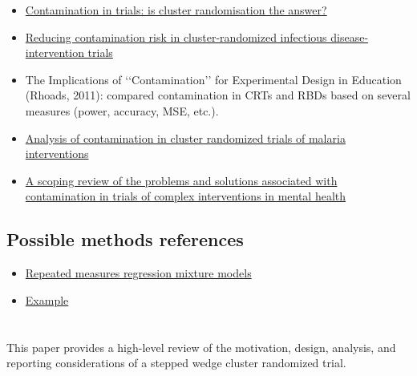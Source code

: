 \documentclass{article}
\begin{document}
\begin{itemize}

\item
\href{https://www.ncbi.nlm.nih.gov/pmc/articles/PMC1119583/}{Contamination in trials: is cluster randomisation the answer?}

\item
\href{https://academic.oup.com/ije/article/47/6/2015/5146518}{Reducing contamination risk in cluster-randomized infectious disease-intervention trials}

\item
The Implications of ‘‘Contamination’’ for Experimental Design in Education (Rhoads, 2011): compared contamination in CRTs and RBDs based on several measures (power, accuracy, MSE, etc.).

\item
\href{https://trialsjournal.biomedcentral.com/articles/10.1186/s13063-021-05543-8}{Analysis of contamination in cluster randomized trials of malaria interventions}

\item
\href{https://bmcmedresmethodol.biomedcentral.com/articles/10.1186/s12874-018-0646-z}{A scoping review of the problems and solutions associated with contamination in trials of complex interventions in mental health}

\end{itemize}

\subsection{Possible methods references}

\begin{itemize}

\item
\href{https://link.springer.com/article/10.3758/s13428-019-01257-7}{Repeated measures regression mixture models}

\item
\href{https://pages.mtu.edu/~shanem/psy5220/daily/Day19/Mixture_of_regressions.html}{Example}

\end{itemize}


\newpage


\section{\textcite{Hemming:2015}}

This paper provides a high-level review of the motivation, design, analysis, and reporting considerations of a stepped wedge cluster randomized trial.
\end{document}
